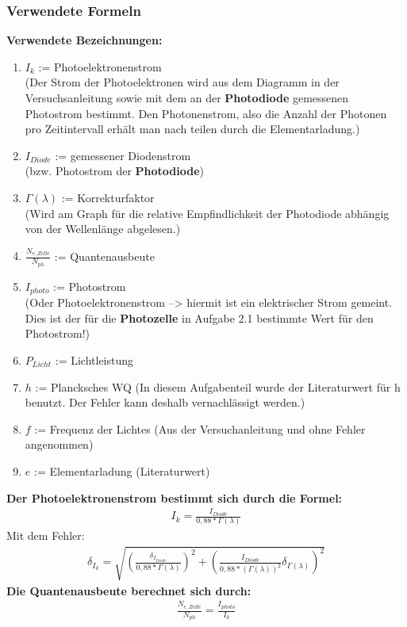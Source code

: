\documentclass[12px]{scrartcl}
\begin{document}
\subsubsection{Verwendete Formeln}
\textbf{Verwendete Bezeichnungen:}
\begin{enumerate}
\item $I_k$ := Photoelektronenstrom\\
(Der Strom der Photoelektronen wird aus dem Diagramm in der Versuchsanleitung sowie mit dem an der \textbf{Photodiode} gemessenen Photostrom bestimmt. Den Photonenstrom, also die Anzahl der Photonen pro Zeitintervall erhält man nach teilen durch die Elementarladung.)
\item $I_{Diode}$ := gemessener Diodenstrom\\
(bzw. Photostrom der \textbf{Photodiode})
\item $\Gamma(\lambda)$ := Korrekturfaktor\\
(Wird am Graph für die relative Empfindlichkeit der Photodiode abhängig von der Wellenlänge abgelesen.)
\item $\frac{N_{e,Zelle}}{N_{ph}}$ := Quantenausbeute
\item $I_{photo}$ := Photostrom\\
(Oder Photoelektronenstrom --> hiermit ist ein elektrischer Strom gemeint. Dies ist der für die \textbf{Photozelle} in Aufgabe 2.1 bestimmte Wert für den Photostrom!)
\item $P_{Licht}$ := Lichtleistung
\item $h$ := Plancksches WQ
(In diesem Aufgabenteil wurde der Literaturwert für h benutzt. Der Fehler kann deshalb vernachlässigt werden.)
\item $f$ := Frequenz der Lichtes
(Aus der Versuchanleitung und ohne Fehler angenommen)
\item $e$ := Elementarladung
(Literaturwert)
\end{enumerate}
\textbf{Der Photoelektronenstrom bestimmt sich durch die Formel:}
\begin{align}
I_k = \frac{I_{Diode}}{0,88*\Gamma(\lambda)}
\label{eqn:i_k}
\end{align}
Mit dem Fehler:
\begin{align}
\delta_{I_k} = \sqrt{
\left(\frac{\delta_{I_{Diode}}}{0,88*\Gamma(\lambda)}\right)^2+
\left(\frac{I_{Diode}}{0,88*(\Gamma(\lambda))^2}
\delta_{\Gamma(\lambda)}\right)^2}
\label{eqn:i_k_delta}
\end{align}
\textbf{Die Quantenausbeute berechnet sich durch:}
\begin{align}
\frac{N_{e,Zelle}}{N_{ph}} = \frac{I_{photo}}{I_{k}}
\end{align}
\end{document}
